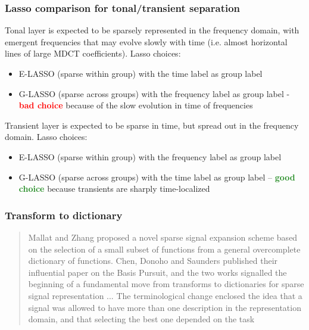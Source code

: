 \documentclass[usenames,dvipsnames]{beamer}
\begin{document}
\begin{frame}
	\frametitle{Lasso comparison for tonal/transient separation}
	Tonal layer is expected to be sparsely represented in the frequency domain, with emergent frequencies that may evolve slowly with time (i.e. almost horizontal lines of large MDCT coefficients). Lasso choices:
	\begin{itemize}
		\item
			E-LASSO (sparse within group) with the time label as group label
		\item
			G-LASSO (sparse across groups) with the frequency label as group label - \textcolor{red}{\textbf{bad choice}} because of the slow evolution in time of frequencies
	\end{itemize}
	Transient layer is expected to be sparse in time, but spread out in the frequency domain. Lasso choices:
	\begin{itemize}
		\item
			E-LASSO (sparse within group) with the frequency label as group label
		\item
			G-LASSO (sparse across groups) with the time label as group label -- \textcolor{ForestGreen}{\textbf{good choice}} because transients are sharply time-localized
	\end{itemize}
\end{frame}

\begin{frame}
	\frametitle{Transform to dictionary} 
	\begin{quote}
		Mallat and Zhang proposed a novel sparse signal expansion scheme based on the selection of a small subset of functions from a general overcomplete dictionary of functions. Chen, Donoho and Saunders published their influential paper on the Basis Pursuit, and the two works signalled the beginning of a fundamental move from transforms to dictionaries for sparse signal representation ... The terminological change enclosed the idea that a signal was allowed to have more than one description in the representation domain, and that selecting the best one depended on the task
	\end{quote}
\end{frame}
\end{document}
